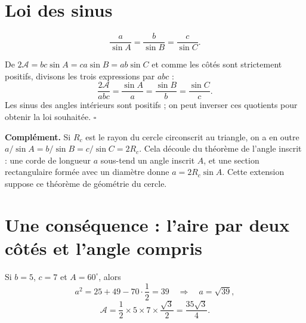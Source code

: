 \documentclass[../cours_spe_trigo.tex]{subfiles}
\begin{document}
\section{Loi des sinus}
\begin{propriete}
\[\boxed{\frac{a}{\sin A}=\frac{b}{\sin B}=\frac{c}{\sin C}.}\]
\end{propriete}
\begin{demonstration}
De $2\mathcal A=bc\sin A=ca\sin B=ab\sin C$ et comme les côtés sont strictement positifs, divisons les trois expressions par $abc$ :
\[
\frac{2\mathcal A}{abc}=\frac{\sin A}{a}=\frac{\sin B}{b}=\frac{\sin C}{c}.
\]
Les sinus des angles intérieurs sont positifs ; on peut inverser ces quotients pour obtenir la loi souhaitée. $\square$
\end{demonstration}
\textbf{Complément.} Si $R_c$ est le rayon du cercle circonscrit au triangle, on a en outre $a/\sin A=b/\sin B=c/\sin C=2R_c$. Cela découle du théorème de l'angle inscrit : une corde de longueur $a$ sous-tend un angle inscrit $A$, et une section rectangulaire formée avec un diamètre donne $a=2R_c\sin A$. Cette extension suppose ce théorème de géométrie du cercle.
\section{Une conséquence : l'aire par deux côtés et l'angle compris}
Si $b=5$, $c=7$ et $A=60^\circ$, alors
\[
a^2=25+49-70\cdot\frac12=39
\quad\Rightarrow\quad a=\sqrt{39},
\]
\[
\mathcal A=\frac12\times5\times7\times\frac{\sqrt3}{2}=\frac{35\sqrt3}{4}.
\]
\end{document}
